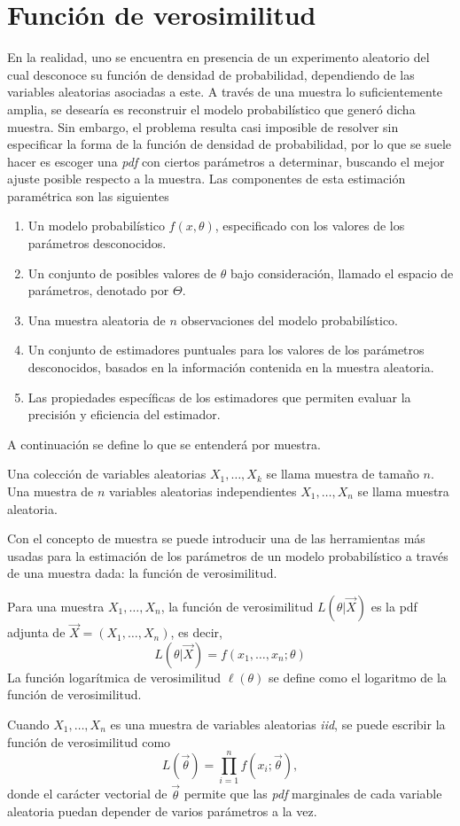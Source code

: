 	\section{Función de verosimilitud}
		En la realidad, uno se encuentra en presencia de un experimento aleatorio del cual desconoce su función de densidad de probabilidad, dependiendo de las variables aleatorias asociadas a este. A través de una muestra lo suficientemente amplia, se desearía es reconstruir el modelo probabilístico que generó dicha muestra. Sin embargo, el problema resulta casi imposible de resolver sin especificar la forma de la función de densidad de probabilidad, por lo que se suele hacer es escoger una \textit{pdf} con ciertos parámetros a determinar, buscando el mejor ajuste posible respecto a la muestra. Las componentes de esta estimación paramétrica son las siguientes \cite{rossi_2018}
		\begin{enumerate}
			\item Un modelo probabilístico $f(x,\theta)$, especificado con los valores de los parámetros desconocidos.
			\item Un conjunto de posibles valores de $\theta$ bajo consideración, llamado el espacio de parámetros, denotado por $\Theta$.
			\item Una muestra aleatoria de $n$ observaciones del modelo probabilístico.
			\item Un conjunto de estimadores puntuales para los valores de los parámetros desconocidos, basados en la información contenida en la muestra aleatoria.
			\item Las propiedades específicas de los estimadores que permiten evaluar la precisión y eficiencia del estimador.
		\end{enumerate}
		A continuación se define lo que se entenderá por muestra.
		\begin{defi}[Muestra]
			Una colección de variables aleatorias $X_1,\dots,X_k$ se llama muestra de tamaño $n$. Una muestra de $n$ variables aleatorias independientes $X_1,\dots,X_n$ se llama muestra aleatoria.
		\end{defi}
		Con el concepto de muestra se puede introducir una de las herramientas más usadas para la estimación de los parámetros de un modelo probabilístico a través de una muestra dada: la función de verosimilitud.
		\begin{defi}
			Para una muestra $X_1,\dots,X_n$, la función de verosimilitud $L(\theta|\vec{X})$ es la pdf adjunta de $\vec{X}=(X_1,\dots,X_n)$, es decir,
$$L(\theta|\vec{X})=f(x_1,\dots,x_n;\theta)$$			
			La función logarítmica de verosimilitud $\ell(\theta)$ se define como el logaritmo de la función de verosimilitud.
		\end{defi}
		Cuando $X_1,\dots,X_n$ es una muestra de variables aleatorias \textit{iid}, se puede escribir la función de verosimilitud como
		$$L(\vec{\theta})=\prod_{i=1}^n f(x_i;\vec{\theta}),$$
		donde el carácter vectorial de $\vec{\theta}$ permite que las \textit{pdf} marginales de cada variable aleatoria puedan depender de varios parámetros a la vez.
		

